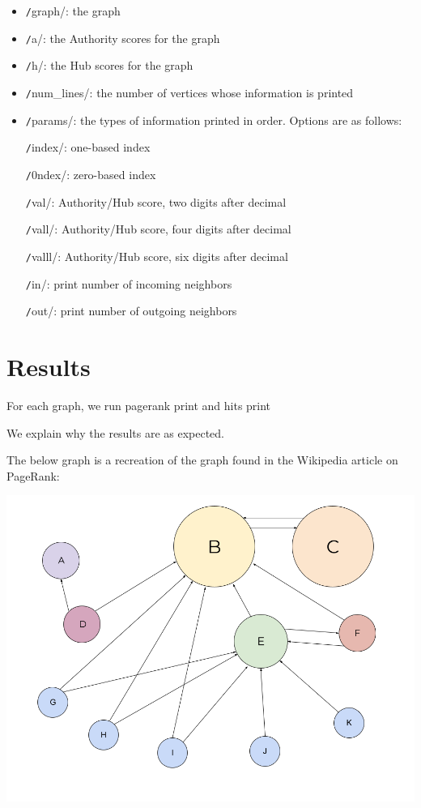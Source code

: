 \documentclass[12pt, titlepage, twoside]{amsart}
\begin{document}
\begin{itemize}[label={}]
\item \texttt/graph/: the graph

\item \texttt/a/: the Authority scores for the graph

\item \texttt/h/: the Hub scores for the graph

\item \texttt/num_lines/: the number of vertices whose information is printed

\item \texttt/params/: the types of information printed in order. Options are as follows:

\texttt/index/: one-based index

\texttt/0ndex/: zero-based index

\texttt/val/: Authority/Hub score, two digits after decimal

\texttt/vall/: Authority/Hub score, four digits after decimal

\texttt/valll/: Authority/Hub score, six digits after decimal

\texttt/in/: print number of incoming neighbors

\texttt/out/: print number of outgoing neighbors
\end{itemize}

\section{Results}


For each graph, we run pagerank print and hits print

We explain why the results are as expected.


The below graph is a recreation of the graph found in the Wikipedia article on PageRank:

\includegraphics[width=\textwidth]{Wikipedia_Medium-graph.png}
\end{document}
